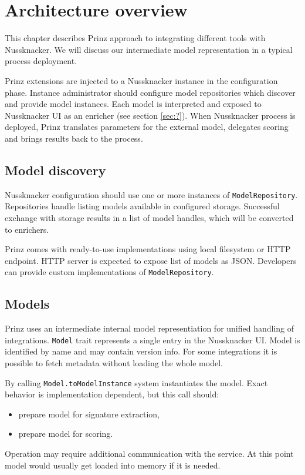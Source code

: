 \chapter{Architecture overview}
\label{chap:arch}

This chapter describes Prinz approach to integrating different tools with Nussknacker.
We will discuss our intermediate model representation in a typical process deployment.

Prinz extensions are injected to a Nussknacker instance in the configuration phase.
Instance administrator should configure model repositories which discover and provide model instances.
Each model is interpreted and exposed to Nussknacker UI as an enricher (see section \ref{sec:?}).
When Nussknacker process is deployed, Prinz translates parameters for the external model, delegates scoring and brings results back to the process.

\section{Model discovery}

Nussknacker configuration should use one or more instances of \texttt{ModelRepository}.
Repositories handle listing models available in configured storage.
Successful exchange with storage results in a list of model handles, which will be converted to enrichers.

Prinz comes with ready-to-use implementations using local filesystem or HTTP endpoint.
HTTP server is expected to expose list of models as JSON.
Developers can provide custom implementations of \texttt{ModelRepository}.

\section{Models}

Prinz uses an intermediate internal model representiation for unified handling of integrations.
\texttt{Model} trait represents a single entry in the Nussknacker UI.
Model is identified by name and may contain version info.
For some integrations it is possible to fetch metadata without loading the whole model.

By calling \texttt{Model.toModelInstance} system instantiates the model.
Exact behavior is implementation dependent, but this call should:
\begin{itemize}
	\item prepare model for signature extraction,
	\item prepare model for scoring.
\end{itemize}
Operation may require additional communication with the service.
At this point model would usually get loaded into memory if it is needed.

